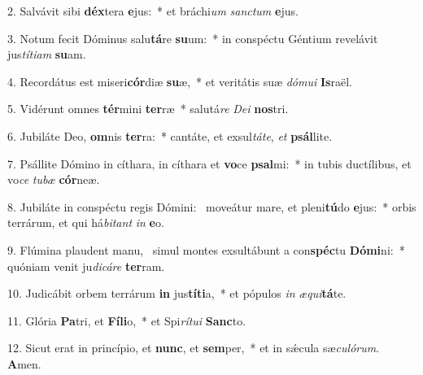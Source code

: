2. Salvávit sibi \textbf{déx}tera \textbf{e}jus:~*  et bráchi\textit{um} \textit{sanc}\textit{tum} \textbf{e}jus.\

3. Notum fecit Dóminus salu\textbf{tá}re \textbf{su}um:~*  in conspéctu Géntium revelávit jus\textit{tí}\textit{ti}\textit{am} \textbf{su}am.\

4. Recordátus est miseri\textbf{cór}diæ \textbf{su}æ,~*  et veritátis suæ \textit{dó}\textit{mu}\textit{i} \textbf{Is}raël.\

5. Vidérunt omnes \textbf{tér}mini \textbf{ter}ræ~*  salutá\textit{re} \textit{De}\textit{i} \textbf{nos}tri.\

6. Jubiláte Deo, \textbf{om}nis \textbf{ter}ra:~*  cantáte, et exsul\textit{tá}\textit{te}, \textit{et} \textbf{psál}lite.\

7. Psállite Dómino in cíthara, in cíthara et \textbf{vo}ce \textbf{psal}mi:~*  in tubis ductílibus, et vo\textit{ce} \textit{tu}\textit{bæ} \textbf{cór}neæ.\

8. Jubiláte in conspéctu regis Dómini: \dag\  moveátur mare, et pleni\textbf{tú}do \textbf{e}jus:~*  orbis terrárum, et qui há\textit{bi}\textit{tant} \textit{in} \textbf{e}o.\

9. Flúmina plaudent manu, \dag\  simul montes exsultábunt a con\textbf{spéc}tu \textbf{Dó}\textbf{mi}ni:~*  quóniam venit ju\textit{di}\textit{cá}\textit{re} \textbf{ter}ram.\

10. Judicábit orbem terrárum \textbf{in} jus\textbf{tí}\textbf{ti}a,~*  et pópulos \textit{in} \textit{æ}\textit{qui}\textbf{tá}te.\

11. Glória \textbf{Pa}tri, et \textbf{Fí}\textbf{li}o,~*  et Spi\textit{rí}\textit{tu}\textit{i} \textbf{Sanc}to.\

12. Sicut erat in princípio, et \textbf{nunc}, et \textbf{sem}per,~*  et in sǽcula sæ\textit{cu}\textit{ló}\textit{rum}. \textbf{A}men.\

